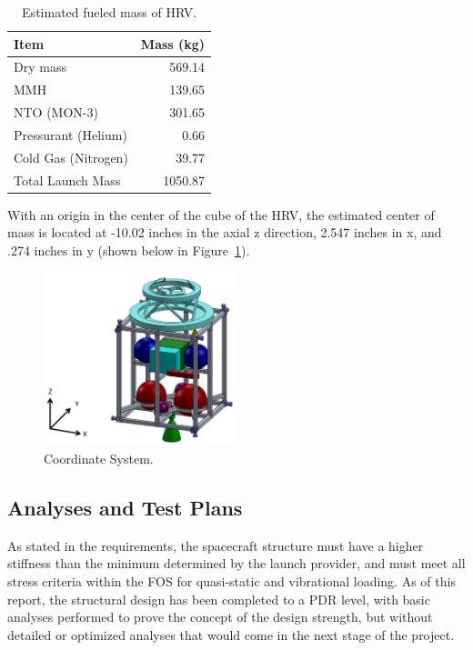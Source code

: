\documentclass[paper=letter, fontsize=11pt]{scrartcl} %
\numberwithin{equation}{section} %
\numberwithin{figure}{section} %
\numberwithin{table}{section} %
\begin{document}
\begin{table}[H]
    \centering
    \begin{tabular}{l r}
        \toprule
        Item                & Mass (kg) \\
        \midrule
        Dry mass            & 569.14    \\
        MMH                 & 139.65    \\
        NTO (MON-3)         & 301.65    \\
        Pressurant (Helium) & 0.66      \\
        Cold Gas (Nitrogen) & 39.77     \\
        \midrule
        Total Launch Mass   & 1050.87   \\
        \bottomrule
    \end{tabular}
    \caption{Estimated fueled mass of HRV.}
    \label{table:fueled_mass}
\end{table}

With an origin in the center of the cube of the HRV, the estimated center of mass is located at -10.02 inches in the axial z direction, 2.547 inches in x, and .274 inches in y (shown below in Figure~\ref{fig:p5}).

\begin{figure}[H]
    \begin{center}
        \includegraphics[width=0.5\textwidth]{Pics/5.png}
        \caption{Coordinate System.}
        \label{fig:p5}
    \end{center}
\end{figure}

\subsection{Analyses and Test Plans}
As stated in the requirements, the spacecraft structure must have a higher stiffness than the minimum determined by the launch provider, and must meet all stress criteria within the FOS for quasi-static and vibrational loading. As of this report, the structural design has been completed to a PDR level, with basic analyses performed to prove the concept of the design strength, but without detailed or optimized analyses that would come in the next stage of the project.
\end{document}
